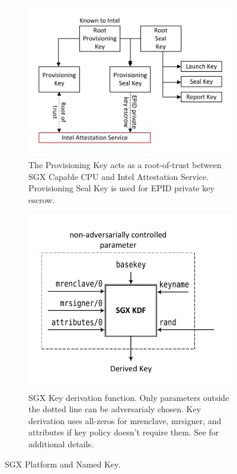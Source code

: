 \documentclass[10pt, letterpaper]{article}
\newcommand{\mrenclave}{\textsf{mrenclave}}
\newcommand{\mrsigner}{\textsf{mrsigner}}
\begin{document}
  \begin{figure}
  \centering
  \begin{subfigure}[t]{.45\textwidth}
    \centering
    \includegraphics[width=\linewidth]{Diagrams/KeyHierarchy}
    \caption{The Provisioning Key acts as a root-of-trust between SGX
      Capable CPU and Intel Attestation Service. Provisioning Seal Key
      is used for EPID private key escrow.}
    \label{fig:keyhierarchy}
  \end{subfigure}
  \hspace{.05\textwidth}
  \begin{subfigure}[t]{.45\textwidth}
    \centering
    \includegraphics[width=\linewidth]{Diagrams/SGXKDF}
    \caption{SGX Key derivation function. Only parameters outside the
      dotted line can be adversarialy chosen. Key derivation uses
      all-zeros for \mrenclave, \mrsigner, and attributes if key policy
      doesn't require them. See \cite[\S38.17]{intelsdm} for
      additional details.}
    \label{fig:sgxkdf}
  \end{subfigure}
  \caption{SGX Platform and Named Key.}
  \label{fig:keys}
  \end{figure}
\end{document}
